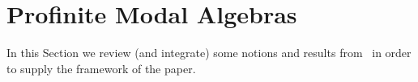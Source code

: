 \documentclass{article}
\theoremstyle{definition}
\begin{document}

\section{Profinite Modal Algebras}\label{sec:pre}


In this Section we review (and integrate) some notions and results from~\cite{MDB-SG} in order to supply the  framework of the paper.
\end{document}

